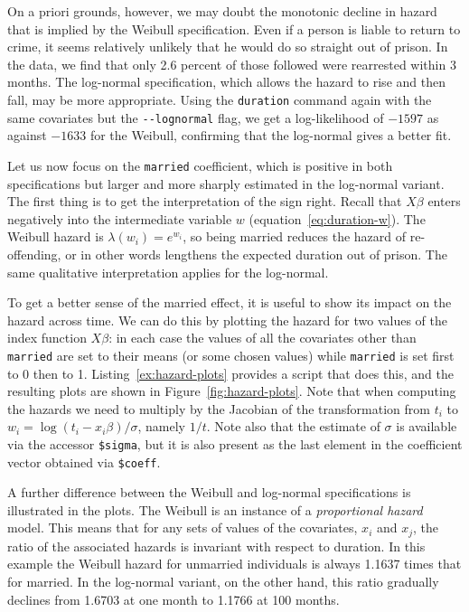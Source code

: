 On a priori grounds, however, we may doubt the monotonic decline in
hazard that is implied by the Weibull specification. Even if a person
is liable to return to crime, it seems relatively unlikely that he
would do so straight out of prison. In the data, we find that only 2.6
percent of those followed were rearrested within 3 months. The
log-normal specification, which allows the hazard to rise and then
fall, may be more appropriate.  Using the \texttt{duration} command
again with the same covariates but the \verb|--lognormal| flag, we get
a log-likelihood of $-1597$ as against $-1633$ for the Weibull,
confirming that the log-normal gives a better fit.

Let us now focus on the \texttt{married} coefficient, which is
positive in both specifications but larger and more sharply estimated
in the log-normal variant. The first thing is to get the
interpretation of the sign right.  Recall that $X\beta$ enters
negatively into the intermediate variable $w$
(equation~\ref{eq:duration-w}). The Weibull hazard is
$\lambda(w_i) = e^{w_i}$, so being married reduces the hazard of
re-offending, or in other words lengthens the expected duration out of
prison.  The same qualitative interpretation applies for the
log-normal.

To get a better sense of the married effect, it is useful to show its
impact on the hazard across time. We can do this by plotting the
hazard for two values of the index function $X\beta$: in each case the
values of all the covariates other than \texttt{married} are set to
their means (or some chosen values) while \texttt{married} is set
first to 0 then to 1. Listing~\ref{ex:hazard-plots} provides a script
that does this, and the resulting plots are shown in
Figure~\ref{fig:hazard-plots}. Note that when computing the hazards we
need to multiply by the Jacobian of the transformation from $t_i$ to
$w_i = \log (t_i - x_i\beta)/\sigma$, namely $1/t$.  Note also that
the estimate of $\sigma$ is available via the accessor \verb|$sigma|,
but it is also present as the last element in the coefficient vector
obtained via \verb|$coeff|.

A further difference between the Weibull and log-normal specifications
is illustrated in the plots. The Weibull is an instance of a
\emph{proportional hazard} model. This means that for any sets of
values of the covariates, $x_i$ and $x_j$, the ratio of the associated
hazards is invariant with respect to duration. In this example the
Weibull hazard for unmarried individuals is always 1.1637 times that
for married. In the log-normal variant, on the other hand, this ratio
gradually declines from 1.6703 at one month to 1.1766 at 100 months.


